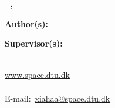 \begin{titlingpage}
	\clearpage
	\thispagestyle{empty}
	\calccentering{\unitlength}
	\begin{adjustwidth*}{\unitlength}{-\unitlength}
		\textbf{\ttitle, \stitle}

		\noindent\textbf{Author(s):}\\
		\authorname


		\noindent\textbf{Supervisor(s):}\\
		\supname


		\noindent\deptname
		 \\
		\noindent\addressname
		\noindent \url{www.space.dtu.dk}\\ 
		\noindent \\ E-mail:~\url{xiahaa@space.dtu.dk}



	\end{adjustwidth*}
\end{titlingpage}